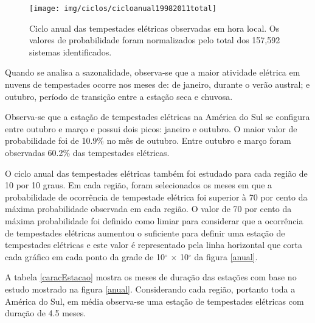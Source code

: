 \begin{figure}[!h]
\centering
{\texttt{[image: img/ciclos/cicloanual19982011total]}}
\caption{Ciclo anual das tempestades elétricas observadas em hora local. Os valores de probabilidade foram normalizados pelo total dos 157,592 sistemas identificados.}
\label{cicloanualtotal}
\end{figure} 


Quando se analisa a sazonalidade, observa-se que a maior atividade elétrica em nuvens de tempestades ocorre nos meses de: de janeiro, durante o verão austral; e outubro, período de transição entre a estação seca e chuvosa.

Observa-se que a estação de tempestades elétricas na América do Sul se configura entre outubro e março e possui dois picos: janeiro e outubro. O maior valor de probabilidade foi de 10.9\%  no mês de outubro. Entre outubro e março foram observadas 60.2\% das tempestades elétricas. %

O ciclo anual das tempestades elétricas também foi estudado para cada região de 10 por 10 graus. Em cada região, foram selecionados os meses em que a probabilidade de ocorrência de tempestade elétrica foi superior à 70 por cento da máxima probabilidade observada em cada região. O valor de 70 por cento da máxima probabilidade foi definido como limiar para considerar que a ocorrência de tempestades elétricas aumentou o suficiente para definir uma estação de tempestades elétricas e este valor é representado pela linha horizontal que corta cada gráfico em cada ponto da grade de 10$^{\circ}$ $\times$ 10$^{\circ}$ da figura \ref{anual}. 

A tabela \ref{caracEstacao} mostra os meses de duração das estações com base no estudo mostrado na figura \ref{anual}. Considerando cada região, portanto toda a América do Sul, em média observa-se uma estação de tempestades elétricas com duração de 4.5 meses. 


